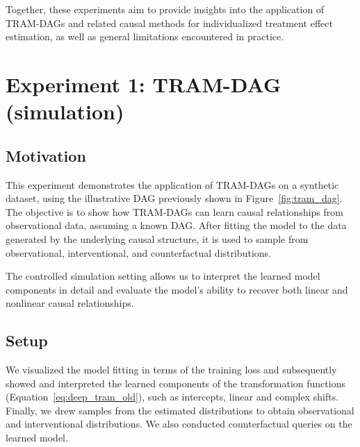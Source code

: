 Together, these experiments aim to provide insights into the application of TRAM-DAGs and related causal methods for individualized treatment effect estimation, as well as general limitations encountered in practice.




\section{Experiment 1: TRAM-DAG (simulation)} \label{ch:exp1}




\subsection{Motivation}

This experiment demonstrates the application of TRAM-DAGs on a synthetic dataset, using the illustrative DAG previously shown in Figure~\ref{fig:tram_dag}. The objective is to show how TRAM-DAGs can learn causal relationships from observational data, assuming a known DAG. After fitting the model to the data generated by the underlying causal structure, it is used to sample from observational, interventional, and counterfactual distributions.

The controlled simulation setting allows us to interpret the learned model components in detail and evaluate the model’s ability to recover both linear and nonlinear causal relationships.






\subsection{Setup} \label{sec:methods_experiment1}

We visualized the model fitting in terms of the training loss and subsequently showed and interpreted the learned components of the transformation functions (Equation~\ref{eq:deep_tram_old}), such as intercepts, linear and complex shifts. Finally, we drew samples from the estimated distributions to obtain observational and interventional distributions. We also conducted counterfactual queries on the learned model.

